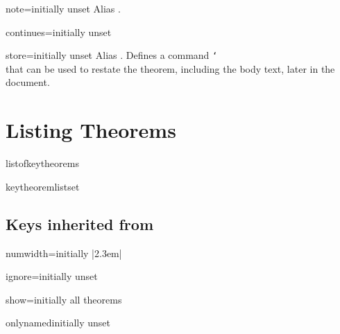 \documentclass{ltxdoc}
\begin{document}
\begin{docKey}{note}{=}{initially unset}
Alias .
\end{docKey}

\begin{docKey}{continues}{=}{initially unset}

\end{docKey}

\begin{docKey}{store}{=}{initially unset}
Alias . Defines a command \texttt{\char`\\} that can be used to restate the theorem, including the body text, later in the document.
\end{docKey}

\section{Listing Theorems}

\begin{docCommand}{listofkeytheorems}{}

\end{docCommand}

\begin{docCommand}{keytheoremlistset}{}

\end{docCommand}

\subsection{Keys inherited from }

\begin{docKey}{numwidth}{=}{initially |2.3em|}

\end{docKey}

\begin{docKey}{ignore}{=}{initially unset}

\end{docKey}

\begin{docKey}{show}{=}{initially all theorems}

\end{docKey}

\begin{docKey}{onlynamed}{}{initially unset}

\end{docKey}
\end{document}
